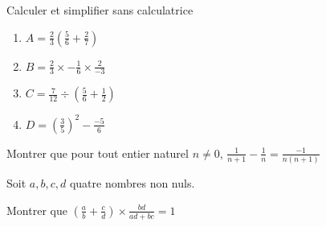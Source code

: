 
Calculer et simplifier sans calculatrice

\begin{enumerate}
\item $A = \frac{2}{3} \left( \frac{5}{6} + \frac{2}{7} \right)$
\item $B = \frac{2}{3} \times - \frac{1}{6} \times \frac{2}{-3}$
\item $C = \frac{7}{12} \div \left( \frac{5}{6} + \frac{1}{2} \right) $
\item $D = \left( \frac{3}{5}\right)^2 -\frac{-5}{6} $
\end{enumerate}



Montrer que pour tout entier naturel $n \neq 0$, $\frac{1}{n+1}-\frac{1}{n}=\frac{-1}{n(n+1)}$



Soit $a, b, c, d$ quatre nombres non nuls.

Montrer que $\left( \frac{a}{b} + \frac{c}{d} \right) \times \frac{bd}{ad+bc} = 1 $

